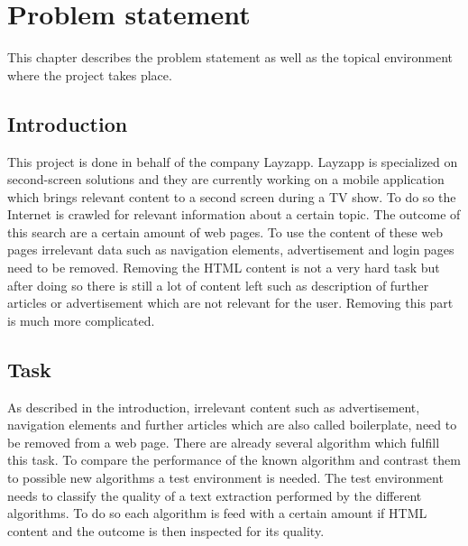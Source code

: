 
\chapter{Problem statement} %

\label{Problem statement} %



This chapter describes the problem statement as well as the topical environment where the project takes place.


\section{Introduction}

This project is done in behalf of the company Layzapp. Layzapp is specialized on second-screen solutions and they are currently working on a mobile application which brings relevant content to a second screen during a TV show. To do so the Internet is crawled for relevant information about a certain topic. The outcome of this search are a certain amount of web pages. To use the content of these web pages irrelevant data such as navigation elements, advertisement and login pages need to be removed. Removing the HTML content is not a very hard task but after doing so there is still a lot of content left such as description of further articles or advertisement which are not relevant for the user. Removing this part is much more complicated. 

\section{Task}

As described in the introduction, irrelevant content such as advertisement, navigation elements and further articles which are also called boilerplate, need to be removed from a web page. There are already several algorithm which fulfill this task. To compare the performance of the known algorithm and contrast them to possible new algorithms a test environment is needed. The test environment needs to classify the quality of a text extraction performed by the different algorithms. To do so each algorithm is feed with a certain amount if HTML content and the outcome is then inspected for its quality. 

